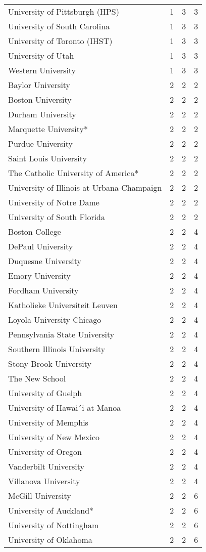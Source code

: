 \begin{longtable}[t]{llll}
University of Pittsburgh (HPS) & 1 & 3 & 3\\
University of South Carolina & 1 & 3 & 3\\
University of Toronto (IHST) & 1 & 3 & 3\\
University of Utah & 1 & 3 & 3\\
Western University & 1 & 3 & 3\\
\addlinespace
Baylor University & 2 & 2 & 2\\
Boston University & 2 & 2 & 2\\
Durham University & 2 & 2 & 2\\
Marquette University* & 2 & 2 & 2\\
Purdue University & 2 & 2 & 2\\
\addlinespace
Saint Louis University & 2 & 2 & 2\\
The Catholic University of America* & 2 & 2 & 2\\
University of Illinois at Urbana-Champaign & 2 & 2 & 2\\
University of Notre Dame & 2 & 2 & 2\\
University of South Florida & 2 & 2 & 2\\
\addlinespace
Boston College & 2 & 2 & 4\\
DePaul University & 2 & 2 & 4\\
Duquesne University & 2 & 2 & 4\\
Emory University & 2 & 2 & 4\\
Fordham University & 2 & 2 & 4\\
\addlinespace
Katholieke Universiteit Leuven & 2 & 2 & 4\\
Loyola University Chicago & 2 & 2 & 4\\
Pennsylvania State University & 2 & 2 & 4\\
Southern Illinois University & 2 & 2 & 4\\
Stony Brook University & 2 & 2 & 4\\
\addlinespace
The New School & 2 & 2 & 4\\
University of Guelph & 2 & 2 & 4\\
University of Hawai´i at Manoa & 2 & 2 & 4\\
University of Memphis & 2 & 2 & 4\\
University of New Mexico & 2 & 2 & 4\\
\addlinespace
University of Oregon & 2 & 2 & 4\\
Vanderbilt University & 2 & 2 & 4\\
Villanova University & 2 & 2 & 4\\
McGill University & 2 & 2 & 6\\
University of Auckland* & 2 & 2 & 6\\
\addlinespace
University of Nottingham & 2 & 2 & 6\\
University of Oklahoma & 2 & 2 & 6\\
\bottomrule
\end{longtable}